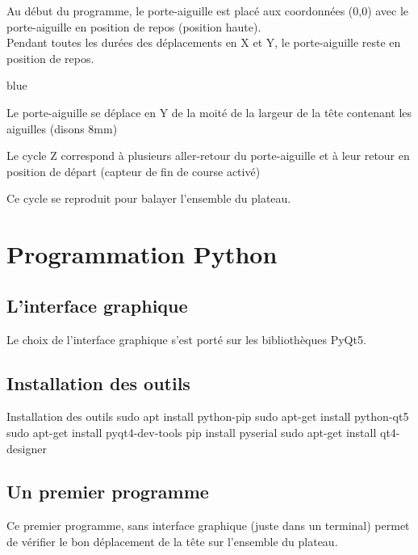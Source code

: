 Au début du programme, le porte-aiguille est placé aux coordonnées (0,0) avec le porte-aiguille en position de repos (position haute).\\
Pendant toutes les durées des déplacements en X et Y, le porte-aiguille reste en position de repos.
\begin{items}{blue}{\Triangle}
\item Le porte-aiguille se déplace en Y de la moité de la largeur de la tête contenant les aiguilles (disons 8mm)
\item Le cycle Z correspond à plusieurs aller-retour du porte-aiguille et à leur retour en position de départ (capteur de fin de course activé)
\end{items}

Ce cycle se reproduit pour balayer l'ensemble du plateau.



\chapter{Programmation Python}

\section{L'interface graphique}

Le choix de l'interface graphique s'est porté sur les bibliothèques PyQt5.\\


\section{Installation des outils}


\begin{Bash}{Installation des outils}
sudo apt install python-pip
sudo apt-get install python-qt5
sudo apt-get install pyqt4-dev-tools 
pip install pyserial
sudo apt-get install qt4-designer
\end{Bash}


    
\section{Un premier programme}

Ce premier programme, sans interface graphique (juste dans un terminal) permet de vérifier le bon déplacement de la tête sur l'ensemble du plateau.

